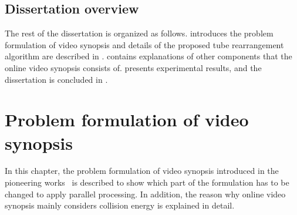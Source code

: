 \documentclass[11pt]{hyu_thesis}
\begin{document}

\section{Dissertation overview}
\label{sec:intro:overview}
The rest of the dissertation is organized as follows.  introduces the problem formulation of video synopsis and details of the proposed tube rearrangement algorithm are described in .  contains explanations of other components that the online video synopsis consists of.  presents experimental results, and the dissertation is concluded in .

\chapter{Problem formulation of video synopsis}
\label{sec:basic_form}

In this chapter, the problem formulation of video synopsis introduced in the pioneering works~\cite{Rav-Acha2006,Pritch2007,Pritch2008} is described to show which part of the formulation has to be changed to apply parallel processing. In addition, the reason why online video synopsis mainly considers collision energy is explained in detail.
\end{document}
